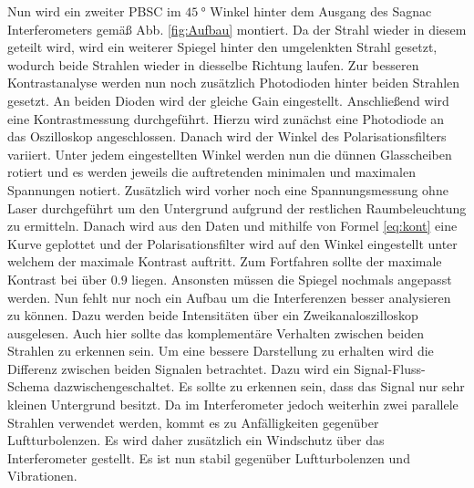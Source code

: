  Nun wird ein zweiter PBSC im $\SI{45}{\degree}$ Winkel hinter dem Ausgang des Sagnac Interferometers gemäß Abb. \ref{fig:Aufbau} montiert. Da der Strahl wieder in diesem geteilt wird, wird ein weiterer Spiegel hinter den umgelenkten Strahl gesetzt, wodurch beide Strahlen wieder in diesselbe Richtung laufen. Zur besseren Kontrastanalyse werden nun noch zusätzlich Photodioden hinter beiden Strahlen gesetzt. An beiden Dioden wird der gleiche Gain eingestellt.
 Anschließend wird eine Kontrastmessung durchgeführt. Hierzu wird zunächst eine Photodiode an das Oszilloskop angeschlossen. Danach wird der Winkel des Polarisationsfilters variiert. Unter jedem eingestellten Winkel werden nun die dünnen Glasscheiben rotiert und es werden jeweils die auftretenden minimalen und maximalen Spannungen notiert. Zusätzlich wird vorher noch eine Spannungsmessung ohne Laser durchgeführt um den Untergrund aufgrund der restlichen Raumbeleuchtung zu ermitteln. Danach wird aus den Daten und mithilfe von Formel \ref{eq:kont} eine Kurve geplottet und der Polarisationsfilter wird auf den Winkel eingestellt unter welchem der maximale Kontrast auftritt. Zum Fortfahren sollte der maximale Kontrast bei über $0.9$ liegen. Ansonsten müssen die Spiegel nochmals angepasst werden. 
Nun fehlt nur noch ein Aufbau um die Interferenzen besser analysieren zu können.
 Dazu werden beide Intensitäten über ein Zweikanaloszilloskop ausgelesen. Auch hier sollte das komplementäre Verhalten zwischen beiden Strahlen zu erkennen sein. Um eine bessere Darstellung zu erhalten wird die Differenz zwischen beiden Signalen betrachtet. Dazu wird ein Signal-Fluss-Schema dazwischengeschaltet. Es sollte zu erkennen sein, dass das Signal nur sehr kleinen Untergrund besitzt. Da im Interferometer jedoch weiterhin zwei parallele Strahlen verwendet werden, kommt es zu Anfälligkeiten gegenüber Luftturbolenzen. Es wird daher zusätzlich ein Windschutz über das Interferometer gestellt. Es ist nun stabil gegenüber Luftturbolenzen und Vibrationen.
 
